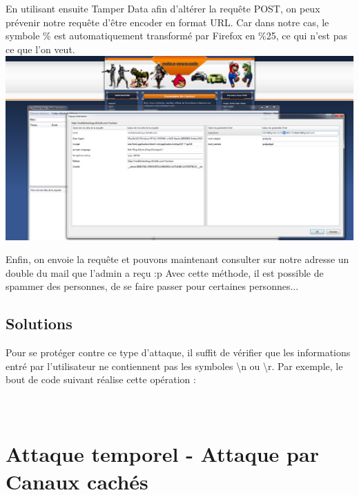 \documentclass{article}
\begin{document}
En utilisant ensuite Tamper Data afin d'altérer la requête POST, on peux prévenir notre requête d'être encoder en format URL. Car dans notre cas, le symbole \% est automatiquement transformé par Firefox en \%25, ce qui n'est pas ce que l'on veut.
\vspace{0.2cm}\\
\includegraphics[width=\textwidth]{10}\\
\vspace{0.2cm}

Enfin, on envoie la requête et pouvons maintenant consulter sur notre adresse un double du mail que l'admin a reçu :p Avec cette méthode, il est possible de spammer des personnes, de se faire passer pour certaines personnes...

\subsection{Solutions}
Pour se protéger contre ce type d'attaque, il suffit de vérifier que les informations entré par l'utilisateur ne contiennent pas les symboles \textbackslash n ou \textbackslash r. Par exemple, le bout de code suivant réalise cette opération :\\
\vspace{0.1cm}\\
\vspace{0.1cm}\\

\newpage
\section{Attaque temporel - Attaque par Canaux cachés}
\end{document}
